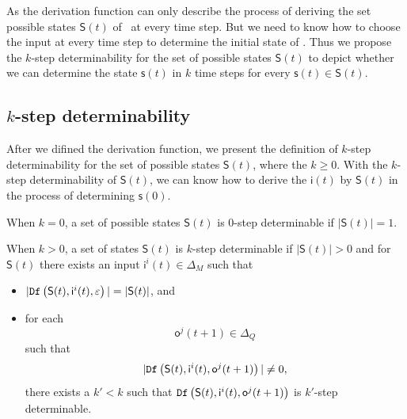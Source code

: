  As the derivation function can only describe the process of deriving the set possible states $\mathsf{S}(t)$ of \BCNs\ at every time step. But we need to know how to choose the input at every time step to determine the initial state of \BCNs. Thus we propose the $k$-step determinability for the set of possible states $\mathsf{S}(t)$ to depict whether we can determine the state $\mathsf{s}(t)$ in $k$ time steps for every $\mathsf{s}(t)\in \mathsf{S}(t)$.
\subsection{$k$-step determinability}
After we difined the derivation function, we present the definition of $k$-step determinability for the set of possible states $\mathsf{S}(t)$, where the $k\ge 0$. With the $k$-step determinability of $\mathsf{S}(t)$, we can know how to derive the $\mathsf{i}(t)$ by $\mathsf{S}(t)$ in the process of determining $\mathsf{s}(0)$. 
\begin{definition} 

When $k=0$, a set of possible states $\mathsf{S}(t)$ is $0$-step determinable if $|\mathsf{S}(t)|=1$. 

When $k>0$, a set of states $\mathsf{S}(t)$ is $k$-step determinable
 if $|\mathsf{S}(t)|>0$ and for $\mathsf{S}(t)$ there exists an input $\mathsf{i}^{i}(t) \in \Delta_M$ such that
 \begin{itemize}
 \item  $|{\tt Df}\left(\mathsf{S}(t),\mathsf{i}^{i}(t),\varepsilon\right)|=|\mathsf{S}(t)|$, and 
 \item  for each \[\mathsf{o}^{j}(t+1)\in \Delta_Q\] such that \[|{\tt Df}\left(\mathsf{S}(t),\mathsf{i}^{i}(t),\mathsf{o}^{j}(t+1)\right)|\neq 0,\] there exists a ${k'}<k$ such that ${\tt Df}\left(\mathsf{S}(t),\mathsf{i}^{i}(t),\mathsf{o}^{j}(t+1)\right)$ is $k'$-step determinable.
 \end{itemize}
\end{definition}

